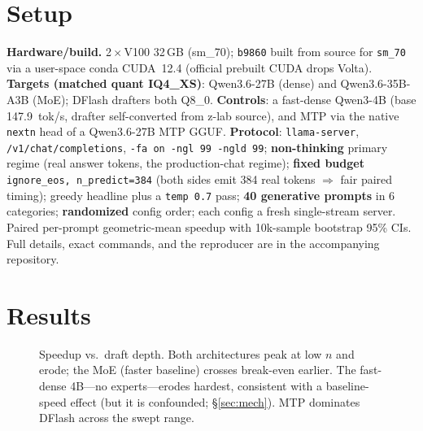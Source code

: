 \documentclass[11pt]{article}
\begin{document}
\section{Setup}
\textbf{Hardware/build.} 2\,$\times$\,V100 32\,GB (sm\_70); \texttt{b9860} built from source for \texttt{sm\_70} via a user-space
conda CUDA~12.4 (official prebuilt CUDA drops Volta). \textbf{Targets (matched quant IQ4\_XS)}: Qwen3.6-27B (dense) and
Qwen3.6-35B-A3B (MoE); DFlash drafters both Q8\_0. \textbf{Controls}: a fast-dense Qwen3-4B (base 147.9~tok/s, drafter self-converted
from z-lab source), and MTP via the native \texttt{nextn} head of a Qwen3.6-27B MTP GGUF. \textbf{Protocol}: \texttt{llama-server},
\texttt{/v1/chat/completions}, \texttt{-fa on -ngl 99 -ngld 99}; \textbf{non-thinking} primary regime (real answer tokens, the
production-chat regime); \textbf{fixed budget} \texttt{ignore\_eos, n\_predict=384} (both sides emit 384 real tokens $\Rightarrow$ fair
paired timing); greedy headline plus a \texttt{temp 0.7} pass; \textbf{40 generative prompts} in 6 categories; \textbf{randomized}
config order; each config a fresh single-stream server. Paired per-prompt geometric-mean speedup with 10k-sample bootstrap 95\% CIs.
Full details, exact commands, and the reproducer are in the accompanying repository.

\section{Results}

\begin{figure}[h]
\centering
{}
\caption{Speedup vs.\ draft depth. Both architectures peak at low $n$ and erode; the MoE (faster baseline) crosses break-even
earlier. The fast-dense 4B---no experts---erodes hardest, consistent with a baseline-speed effect (but it is confounded;
\S\ref{sec:mech}). MTP dominates DFlash across the swept range.}
\label{fig:speedup}
\end{figure}
\end{document}
